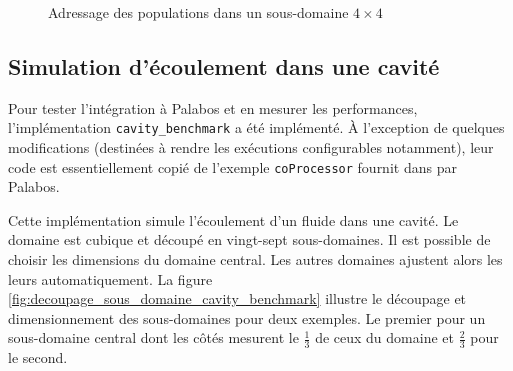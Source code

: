\begin{figure}[h]
{		\label{fig:cp_index_z_0}
	}
	\caption{Adressage des populations dans un sous-domaine $4\times4$}
	\label{fig:adressage_cp}
\end{figure}

\subsection{Simulation d'écoulement dans une cavité} \label{title-cavity_benchmark}
Pour tester l'intégration à Palabos et en mesurer les performances, l'implémentation \texttt{cavity\_benchmark} a été implémenté. À l'exception de quelques modifications (destinées à rendre les exécutions configurables notamment), leur code est essentiellement copié de l'exemple \texttt{coProcessor} fournit dans par Palabos.

Cette implémentation simule l'écoulement d'un fluide dans une cavité. Le domaine est cubique et découpé en vingt-sept sous-domaines. Il est possible de choisir les dimensions du domaine central. Les autres domaines ajustent alors les leurs automatiquement. La figure \ref{fig:decoupage_sous_domaine_cavity_benchmark} illustre le découpage et dimensionnement des sous-domaines pour deux exemples. Le premier pour un sous-domaine central dont les côtés mesurent le $\frac{1}{3}$ de ceux du domaine et  $\frac{2}{3}$ pour le second.


